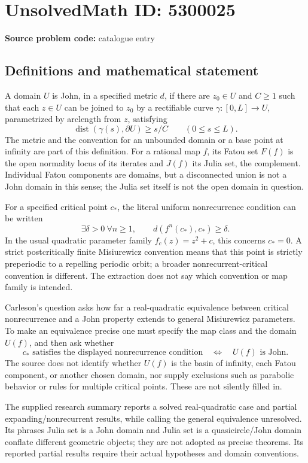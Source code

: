 \documentclass[11pt]{article}
\begin{document}
\section*{UnsolvedMath ID: 5300025}
\textbf{Source problem code:} catalogue entry
\subsection{Definitions and mathematical statement}
A domain \(U\) is John, in a specified metric \(d\), if there are \(z_0\in U\) and \(C\ge1\) such that each \(z\in U\) can be joined to \(z_0\) by a rectifiable curve \(\gamma:[0,L]\to U\), parametrized by arclength from \(z\), satisfying
\[
\operatorname{dist}(\gamma(s),\partial U)\ge s/C\qquad(0\le s\le L).
\]
The metric and the convention for an unbounded domain or a base point at infinity are part of this definition. For a rational map \(f\), its Fatou set \(F(f)\) is the open normality locus of its iterates and \(J(f)\) its Julia set, the complement. Individual Fatou components are domains, but a disconnected union is not a John domain in this sense; the Julia set itself is not the open domain in question.

For a specified critical point \(c_*\), the literal uniform nonrecurrence condition can be written
\[
\exists\delta>0\ \forall n\ge1,\qquad d(f^n(c_*),c_*)\ge\delta.
\]
In the usual quadratic parameter family \(f_c(z)=z^2+c\), this concerns \(c_*=0\). A strict postcritically finite Misiurewicz convention means that this point is strictly preperiodic to a repelling periodic orbit; a broader nonrecurrent-critical convention is different. The extraction does not say which convention or map family is intended.

Carleson's question asks how far a real-quadratic equivalence between critical nonrecurrence and a John property extends to general Misiurewicz parameters. To make an equivalence precise one must specify the map class and the domain \(U(f)\), and then ask whether
\[
c_*\text{ satisfies the displayed nonrecurrence condition}
\quad\Longleftrightarrow\quad U(f)\text{ is John}.
\]
The source does not identify whether \(U(f)\) is the basin of infinity, each Fatou component, or another chosen domain, nor supply exclusions such as parabolic behavior or rules for multiple critical points. These are not silently filled in.

The supplied research summary reports a solved real-quadratic case and partial expanding/nonrecurrent results, while calling the general equivalence unresolved. Its phrases Julia set is a John domain and Julia set is a quasicircle/John domain conflate different geometric objects; they are not adopted as precise theorems. Its reported partial results require their actual hypotheses and domain conventions.
\end{document}
